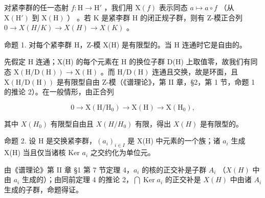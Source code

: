 对紧李群的任一态射 \(f: \mathrm{H} \to \mathrm{H}'\) ，我们用 \(\mathrm{X}(f)\) 表示同态 \(a \mapsto a \circ f\) （从 \(\mathrm{X}(\mathrm{H}')\) 到 \(\mathrm{X}(\mathrm{H})\) ） 。若 \(\mathrm{K}\) 是紧李群 H 的闭正规子群，则有 Z-模正合列 \(0 \rightarrow X(H/K) \rightarrow X(H) \rightarrow X(K)\) 。

命题 1. 对每个紧李群 H，Z-模 X(H) 是有限型的。当 H 连通时它是自由的。

先假定 H 连通；X(H) 的每个元素在 H 的换位子群 D(H) 上取值零，故我们有同态 \(\mathrm{X}(\mathrm{H}/\mathrm{D}(\mathrm{H}))\to\mathrm{X}(\mathrm{H})\) 。而 \(\mathrm{H}/\mathrm{D}(\mathrm{H})\) 连通且交换，故是环面，且 \(\mathrm{X}(\mathrm{H}/\mathrm{D}(\mathrm{H}))\) 是有限型自由 Z-模（《谱理论》，第 II 章，§2，第 1 节，命题 1 的推论 2）。在一般情形，由正合列

\[
0 \to \mathrm{X} (\mathrm{H} / \mathrm{H} _ {0}) \to \mathrm{X} (\mathrm{H}) \to \mathrm{X} (\mathrm{H} _ {0}),
\]

其中 \(X(H_{0})\) 有限型自由且 \(X(H/H_{0})\) 有限，得出 \(X(H)\) 是有限型的。

命题 2. 设 H 是交换紧李群，\((a_{i})_{i\in I}\) 是 X(H) 中元素的一个族；诸 \(a_{i}\) 生成 X(H) 当且仅当诸核 Ker \(a_{i}\) 之交约化为单位元。

由《谱理论》第 II 章 §1 第 7 节定理 4，\(a_i\) 的核的正交补是子群 \(A_i\) （\(X(H)\) 中由 \(a_i\) 生成的）；由同前定理 4 的推论 2，\(\bigcap \operatorname{Ker} a_i\) 的正交补是 \(X(H)\) 中由诸 \(A_i\) 生成的子群，命题得证。

